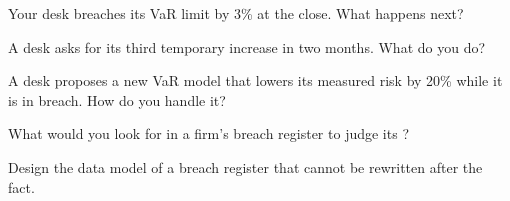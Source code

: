 \begin{interviewq}\label{iq:fm:the-risk-management-function:2}
Your desk breaches its VaR limit by 3\% at the close. What happens next?
\end{interviewq}

\begin{interviewq}\label{iq:fm:the-risk-management-function:3}
A desk asks for its third temporary increase in two months. What do you do?
\end{interviewq}

\begin{interviewq}\label{iq:fm:the-risk-management-function:4}
A desk proposes a new VaR model that lowers its measured risk by 20\% while it is in breach. How do you handle it?
\end{interviewq}

\begin{interviewq}\label{iq:fm:the-risk-management-function:5}
What would you look for in a firm's breach register to judge its ?
\end{interviewq}

\begin{interviewq}\label{iq:fm:the-risk-management-function:6}
Design the data model of a breach register that cannot be rewritten after the fact.
\end{interviewq}
